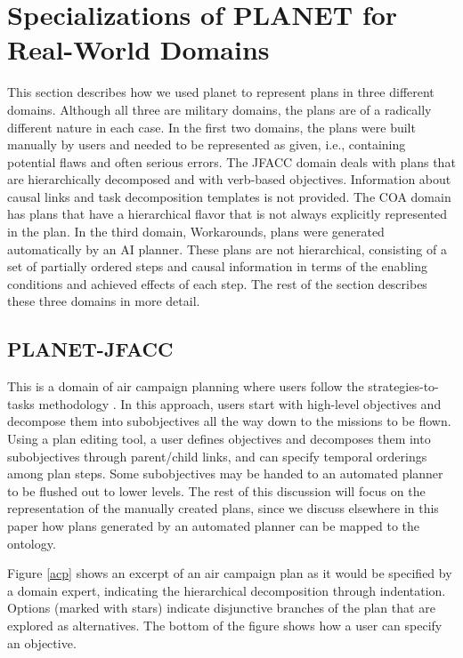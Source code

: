 \section{Specializations of PLANET for Real-World Domains}

This section describes how we used {\sc planet} to represent plans
in three different domains.  
Although all three are military domains, 
the plans are of a radically different nature in each case.  
In the first two domains, the plans were built manually by users
and needed to be represented as given, i.e., 
containing potential flaws and often serious errors. 
The JFACC domain deals with plans that are hierarchically decomposed 
and with verb-based objectives.  Information about causal links 
and task decomposition templates is not provided.
The COA domain has plans that have a hierarchical flavor that
is not always explicitly represented in the plan.  
In the third domain, Workarounds, plans were generated automatically by
an AI planner.  These plans are not hierarchical, consisting of 
a set of partially ordered steps and causal information in terms of
the enabling conditions and achieved effects of each step.  
The rest of the section describes these three domains in more detail.


\subsection{PLANET-JFACC}

This is a domain of air campaign planning where 
users follow the strategies-to-tasks methodology
\cite{todd-94,thaler-93}. 
In this approach, users start with high-level
objectives and decompose them into subobjectives all
the way down to the missions to be flown.  
Using a plan editing tool, a user defines objectives
and decomposes them into subobjectives through parent/child links, 
and can specify temporal orderings among plan steps.  
Some subobjectives may be handed to an automated 
planner to be flushed out to lower levels.  
The rest of this discussion 
will focus on the representation
of the manually created plans, since 
we discuss elsewhere in this paper how plans 
generated by an automated planner can be mapped to the 
ontology.  

Figure \ref{acp} shows an excerpt of an air campaign plan
as it would be specified by a domain expert,
indicating the hierarchical decomposition through indentation.
Options (marked with stars) indicate 
disjunctive branches of the plan that are explored as alternatives.
The bottom of the figure shows how  a user can specify an objective.

